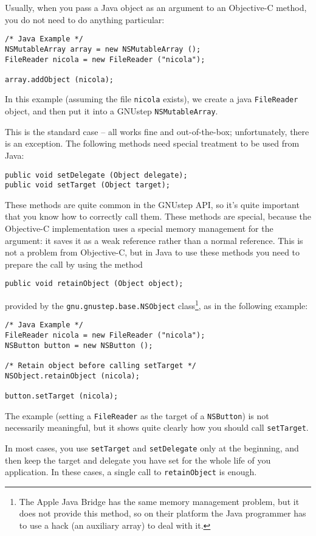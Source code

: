 Usually, when you pass a Java object as an argument to an Objective-C 
method, you do not need to do anything particular:
\begin{verbatim}
/* Java Example */
NSMutableArray array = new NSMutableArray ();
FileReader nicola = new FileReader ("nicola");

array.addObject (nicola);
\end{verbatim}
In this example (assuming the file \texttt{nicola} exists), we create
a java \texttt{FileReader} object, and then put it into a GNUstep
\texttt{NSMutableArray}.

This is the standard case -- all works fine and out-of-the-box;
unfortunately, there is an exception.  The following methods need
special treatment to be used from Java:
\begin{verbatim}
public void setDelegate (Object delegate);
public void setTarget (Object target);
\end{verbatim}
These methods are quite common in the GNUstep API, so it's quite
important that you know how to correctly call them.  These methods are
special, because the Objective-C implementation uses a special memory
management for the argument: it saves it as a weak reference rather
than a normal reference.  This is not a problem from Objective-C, but
in Java to use these methods you need to prepare the call by using the
method
\begin{verbatim}
public void retainObject (Object object);
\end{verbatim}
provided by the \texttt{gnu.gnustep.base.NSObject} class\footnote{The
Apple Java Bridge has the same memory management problem, but it does
not provide this method, so on their platform the Java programmer has
to use a hack (an auxiliary array) to deal with it.}, as in the
following example:
\begin{verbatim}
/* Java Example */
FileReader nicola = new FileReader ("nicola");
NSButton button = new NSButton ();

/* Retain object before calling setTarget */
NSObject.retainObject (nicola);

button.setTarget (nicola);
\end{verbatim}
The example (setting a \texttt{FileReader} as the target of a
\texttt{NSButton}) is not necessarily meaningful, but it shows quite 
clearly how you should call \texttt{setTarget}.

In most cases, you use \texttt{setTarget} and \texttt{setDelegate}
only at the beginning, and then keep the target and delegate you have 
set for the whole life of you application.  In these cases, a single 
call to \texttt{retainObject} is enough.

